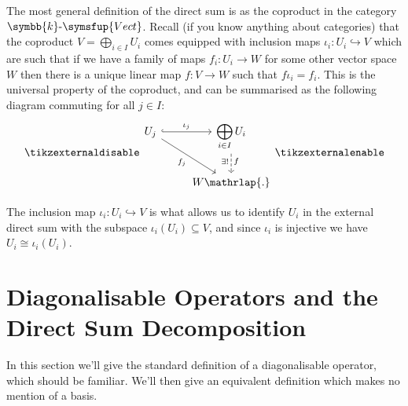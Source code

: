 \documentclass[fleqn]{NotesClass}
\makeatletter
\renewcommand{\field}{\symbb{k}}
\newcommand{\c@egory}[1]{\symsfup{#1}}
\newcommand{\Vect}[1][\field]{#1\text{-}\c@egory{Vect}}
\newcommand{\isomorphic}{\cong}
\makeatother
\begin{document}
    \begin{remark}{}{}
        The most general definition of the direct sum is as the coproduct in the category \(\Vect\).
        Recall (if you know anything about categories) that the coproduct \(V = \bigoplus_{i \in I} U_i\) comes equipped with inclusion maps \(\iota_i \colon U_i \hookrightarrow V\) which are such that if we have a family of maps \(f_i \colon U_i \to W\) for some other vector space \(W\) then there is a unique linear map \(f \colon V \to W\) such that \(f\iota_i = f_i\).
        This is the universal property of the coproduct, and can be summarised as the following diagram commuting for all \(j \in I\):
        \begin{equation}
            \tikzexternaldisable
            \begin{tikzcd}
                U_j \arrow[r, hookrightarrow, "\iota_j"] \arrow[dr, "f_j"'] & \displaystyle \bigoplus_{i \in I} U_i \arrow[d, dashed, "f", "\exists!"', pos=0.4]\\
                & W\mathrlap{.}
            \end{tikzcd}
            \tikzexternalenable
        \end{equation}
        
        The inclusion map \(\iota_i \colon U_i \hookrightarrow V\) is what allows us to identify \(U_i\) in the external direct sum with the subspace \(\iota_i(U_i) \subseteq V\), and since \(\iota_i\) is injective we have \(U_i \isomorphic \iota_i(U_i)\).
    \end{remark}
    
    \section{Diagonalisable Operators and the Direct Sum Decomposition}
    In this section we'll give the standard definition of a diagonalisable operator, which should be familiar.
    We'll then give an equivalent definition which makes no mention of a basis.
    
\end{document}
